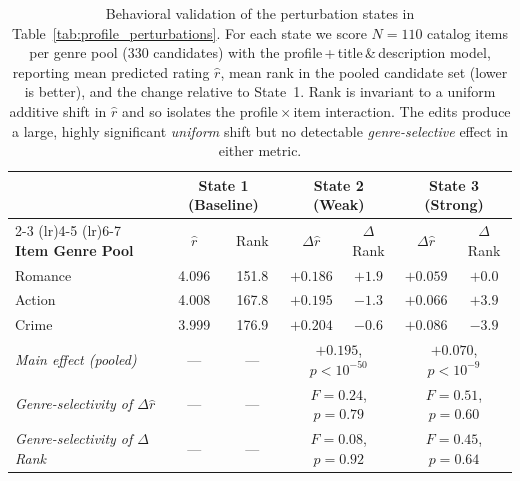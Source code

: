 \begin{table}[t]
    \centering
    \small
    \caption{Behavioral validation of the perturbation states in Table~\ref{tab:profile_perturbations}. For each state we score $N{=}110$ catalog items per genre pool ($330$ candidates) with the profile\,+\,title\,\&\,description model, reporting mean predicted rating $\hat{r}$, mean rank in the pooled candidate set (lower is better), and the change relative to State~1. Rank is invariant to a uniform additive shift in $\hat{r}$ and so isolates the profile\,$\times$\,item interaction. The edits produce a large, highly significant \emph{uniform} shift but no detectable \emph{genre-selective} effect in either metric.}
    \label{tab:behavioral_validation}
    \begin{tabular}{lcccccc}
    \toprule
     & \multicolumn{2}{c}{\textbf{State 1 (Baseline)}} & \multicolumn{2}{c}{\textbf{State 2 (Weak)}} & \multicolumn{2}{c}{\textbf{State 3 (Strong)}} \\
    \cmidrule(lr){2-3} \cmidrule(lr){4-5} \cmidrule(lr){6-7}
    \textbf{Item Genre Pool} & $\hat{r}$ & Rank & $\Delta\hat{r}$ & $\Delta$Rank & $\Delta\hat{r}$ & $\Delta$Rank \\
    \midrule
    Romance & 4.096 & 151.8 & $+0.186$ & $+1.9$ & $+0.059$ & $+0.0$ \\
    Action  & 4.008 & 167.8 & $+0.195$ & $-1.3$ & $+0.066$ & $+3.9$ \\
    Crime   & 3.999 & 176.9 & $+0.204$ & $-0.6$ & $\mathbf{+0.086}$ & $\mathbf{-3.9}$ \\
    \midrule
    \emph{Main effect (pooled)} & --- & --- & \multicolumn{2}{c}{$+0.195$, $p{<}10^{-50}$} & \multicolumn{2}{c}{$+0.070$, $p{<}10^{-9}$} \\
    \emph{Genre-selectivity of $\Delta\hat{r}$} & --- & --- & \multicolumn{2}{c}{$F{=}0.24$, $p{=}0.79$} & \multicolumn{2}{c}{$F{=}0.51$, $p{=}0.60$} \\
    \emph{Genre-selectivity of $\Delta$Rank}    & --- & --- & \multicolumn{2}{c}{$F{=}0.08$, $p{=}0.92$} & \multicolumn{2}{c}{$F{=}0.45$, $p{=}0.64$} \\
    \bottomrule
    \end{tabular}
\end{table}

